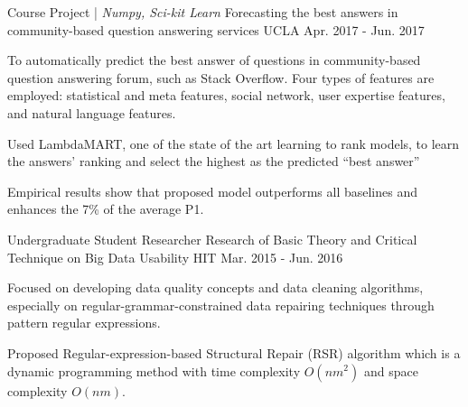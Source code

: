 \begin{cventries}
\cventry
  {Course Project | \textit{Numpy, Sci-kit Learn}}
	{Forecasting the best answers in community-based question answering services}
	{UCLA}
	{Apr. 2017 - Jun. 2017}
	{
		\begin{cvitems}
			\item {To automatically predict the best answer of questions in community-based question answering forum, such as Stack Overflow. Four types of features are employed: statistical and meta features, social network, user expertise features, and natural language features.}
			\item {Used LambdaMART, one of the state of the art learning to rank models, to learn the answers' ranking and select the highest as the predicted ``best answer''}
			\item {Empirical results show that proposed model outperforms all baselines and enhances the 7\% of the average P\@1.}
		\end{cvitems}
	}
\vspace{-1em}
  \cventry
    {Undergraduate Student Researcher}
    {Research of Basic Theory and Critical Technique on Big Data Usability}
    {HIT}
    {Mar. 2015 - Jun. 2016}
    {
      \begin{cvitems}
        \item{Focused on developing data quality concepts and data cleaning algorithms, especially on  regular-grammar-constrained data repairing techniques through pattern regular expressions.}
        \item{Proposed Regular-expression-based Structural Repair (RSR) algorithm which is a dynamic programming method with time complexity $O(nm^2)$ and space complexity $O(nm)$.}

\end{cvitems}}
\end{cventries}
